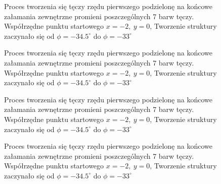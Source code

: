 \begin{figure}[H]\ContinuedFloat
    \centering
    \caption{Proces tworzenia się tęczy rzędu pierwszego podzielonę na końcowe załamania zewnętrzne promieni poszczególnych 7 barw tęczy. Współrzędne punktu startowego $x=-2,~y=0$, Tworzenie struktury zaczynało się od $\phi=-34.5^{\circ}$ do $\phi=-33^{\circ}$}
\end{figure}
\begin{figure}[H]\ContinuedFloat
    \centering
    \caption{Proces tworzenia się tęczy rzędu pierwszego podzielonę na końcowe załamania zewnętrzne promieni poszczególnych 7 barw tęczy. Współrzędne punktu startowego $x=-2,~y=0$, Tworzenie struktury zaczynało się od $\phi=-34.5^{\circ}$ do $\phi=-33^{\circ}$}
\end{figure}
\begin{figure}[H]\ContinuedFloat
    \centering
    \caption{Proces tworzenia się tęczy rzędu pierwszego podzielonę na końcowe załamania zewnętrzne promieni poszczególnych 7 barw tęczy. Współrzędne punktu startowego $x=-2,~y=0$, Tworzenie struktury zaczynało się od $\phi=-34.5^{\circ}$ do $\phi=-33^{\circ}$}
\end{figure}
\begin{figure}[H]\ContinuedFloat
    \centering
    \caption{Proces tworzenia się tęczy rzędu pierwszego podzielonę na końcowe załamania zewnętrzne promieni poszczególnych 7 barw tęczy. Współrzędne punktu startowego $x=-2,~y=0$, Tworzenie struktury zaczynało się od $\phi=-34.5^{\circ}$ do $\phi=-33^{\circ}$}
\end{figure}
